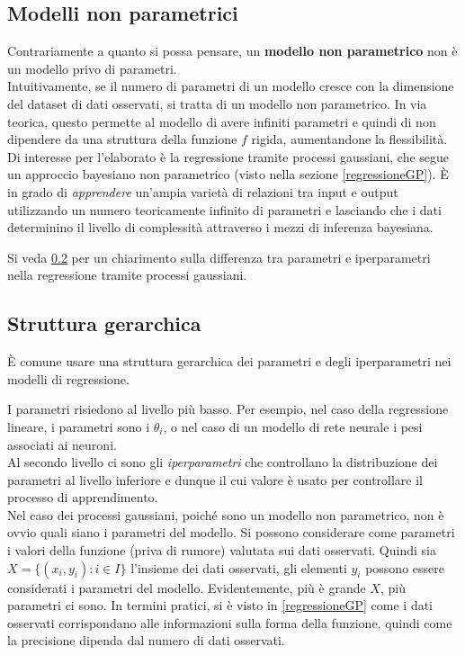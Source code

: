 \subsection{Modelli non parametrici}
Contrariamente a quanto si possa pensare, un \textbf{modello non parametrico} non è un modello privo di parametri. \\
Intuitivamente, se il numero di parametri di un modello cresce con la dimensione del dataset di dati osservati, si tratta di un modello non parametrico. In via teorica, questo permette al modello di avere infiniti parametri e quindi di non dipendere da una struttura della funzione $f$ rigida, aumentandone la flessibilità.\\
Di interesse per l'elaborato è la regressione tramite processi gaussiani, che segue un approccio bayesiano non parametrico (visto nella sezione \ref{regressioneGP}). È in grado di \textit{apprendere} un'ampia varietà di  relazioni tra input e output utilizzando un numero teoricamente infinito di parametri e lasciando che i dati determinino il livello di complessità attraverso i mezzi di inferenza bayesiana.

Si veda \ref{gerarchica} per un chiarimento sulla differenza tra parametri e iperparametri nella regressione tramite processi gaussiani.

\newpage

\subsection{Struttura gerarchica}\label{gerarchica}
È comune usare una struttura gerarchica dei parametri e degli iperparametri nei modelli di regressione.

I parametri risiedono al livello più basso. Per esempio, nel caso della regressione lineare, i parametri sono i $\theta_i$, o nel caso di un modello di rete neurale i pesi associati ai neuroni.\\
Al secondo livello ci sono gli \textit{iperparametri} che controllano la distribuzione dei parametri al livello inferiore e dunque il cui valore è usato per controllare il processo di apprendimento.\\

Nel caso dei processi gaussiani, poiché sono un modello non parametrico, non è ovvio quali siano i parametri del modello. Si possono considerare come parametri i valori della funzione (priva di rumore) valutata sui dati osservati. Quindi sia $X=\{(x_i,y_i): i\in I\}$ l'insieme dei dati osservati, gli elementi $y_i$ possono essere considerati i parametri del modello. Evidentemente, più è grande $X$, più parametri ci sono. In termini pratici, si è visto in \ref{regressioneGP} come i dati osservati corrispondano alle informazioni sulla forma della funzione, quindi come la precisione dipenda dal numero di dati osservati.

